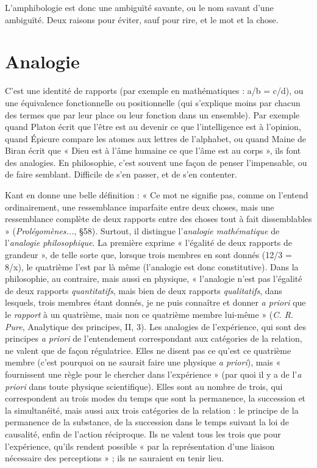 L’amphibologie est donc une ambiguïté savante, ou le nom savant d’une
ambiguïté. Deux raisons pour éviter, sauf pour rire, et le mot et la chose.

\section{Analogie}
C’est une identité de rapports (par exemple en mathématiques :
a/b = c/d), ou une équivalence fonctionnelle ou positionnelle
(qui s'explique moins par chacun des termes que par leur place ou leur fonction
dans un ensemble). Par exemple quand Platon écrit que l’être est au devenir ce
que l'intelligence est à l'opinion, quand Épicure compare les atomes aux lettres
de l’alphabet, ou quand Maine de Biran écrit que « Dieu est à l’âme humaine
ce que l’âme est au corps », ils font des analogies. En philosophie, c’est souvent
une façon de penser l’impensable, ou de faire semblant. Difficile de s’en passer,
et de s’en contenter.

Kant en donne une belle définition : « Ce mot ne signifie pas, comme on
l'entend ordinairement, une ressemblance imparfaite entre deux choses, mais
une ressemblance complète de deux rapports entre des choses tout à fait
dissemblables » ({\it Prolégomènes...}, \S 58). Surtout, il distingue l’{\it analogie mathématique}
de l’{\it analogie philosophique}. La première exprime « l'égalité de deux rapports
de grandeur », de telle sorte que, lorsque trois membres en sont donnés
(12/3 = 8/x), le quatrième l’est par là même (l’analogie est donc constitutive).
Dans la philosophie, au contraire, mais aussi en physique, « l’analogie n’est pas
l'égalité de deux rapports {\it quantitatifs}, mais bien de deux rapports {\it qualitatifs},
dans lesquels, trois membres étant donnés, je ne puis connaître et donner {\it a
priori} que le {\it rapport} à un quatrième, mais non ce quatrième membre lui-même »
({\it C. R. Pure}, Analytique des principes, II, 3). Les analogies de l’expérience,
qui sont des principes {\it a priori} de l’entendement correspondant aux catégories
de la relation, ne valent que de façon régulatrice. Elles ne disent pas ce
qu’est ce quatrième membre (c’est pourquoi on ne saurait faire une physique {\it a
priori}), mais « fournissent une règle pour le chercher dans l'expérience » (par
quoi il y a de l’{\it a priori} dans toute physique scientifique). Elles sont au nombre
de trois, qui correspondent au trois modes du temps que sont la permanence,
la succession et la simultanéité, mais aussi aux trois catégories de la relation : le
principe de la permanence de la substance, de la succession dans le temps suivant
la loi de causalité, enfin de l’action réciproque. Ils ne valent tous les trois
que pour l'expérience, qu’ils rendent possible « par la représentation d’une
liaison nécessaire des perceptions » ; ils ne sauraient en tenir lieu.

